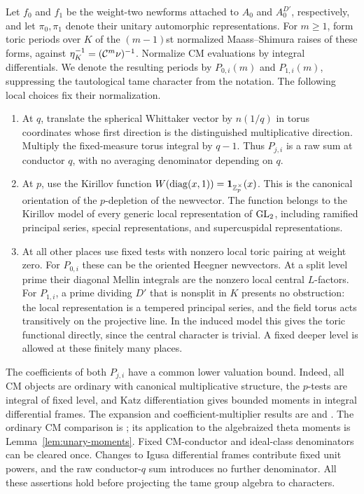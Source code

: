 Let $f_0$ and $f_1$ be the weight-two newforms attached to $A_0$ and
$A_0^{D'}$, respectively, and let $\pi_0,\pi_1$ denote their unitary
automorphic representations.  For $m\ge1$, form toric periods over $K$ of
the $(m-1)$st normalized Maass--Shimura raises of these forms, against
$\eta_K^{-1}=(\mathcal C^m\nu)^{-1}$.  Normalize CM evaluations by integral
differentials.  We denote the resulting periods by $P_{0,i}(m)$ and
$P_{1,i}(m)$, suppressing the tautological tame character from the
notation.  The following local choices fix their normalization.

\begin{enumerate}
\item At $q$, translate the spherical Whittaker vector by $n(1/q)$ in
torus coordinates whose first direction is the distinguished
multiplicative direction.  Multiply the fixed-measure torus integral by
$q-1$.  Thus $P_{j,i}$ is a raw sum at conductor $q$, with no averaging
denominator depending on $q$.
\item At $p$, use the Kirillov function
$W(\operatorname{diag}(x,1))=\mathbf 1_{\mathbb Z_p^\times}(x)$.  This is the canonical orientation
of the $p$-depletion of the newvector.  The function belongs to the
Kirillov model of every generic local representation of $\operatorname{GL}_2$, including
ramified principal series, special representations, and supercuspidal
representations.
\item At all other places use fixed tests with nonzero local toric
pairing at weight zero.  For $P_{0,i}$ these can be the oriented Heegner
newvectors.  At a split level prime their diagonal Mellin integrals are
the nonzero local central $L$-factors.  For $P_{1,i}$, a prime dividing
$D'$ that is nonsplit in $K$ presents no obstruction: the local
representation is a tempered principal series, and the field torus acts
transitively on the projective line.  In the induced model this gives
the toric functional directly, since the central character is trivial.
A fixed deeper level is allowed at these finitely many places.
\end{enumerate}

The coefficients of both $P_{j,i}$ have a common lower valuation bound.
Indeed, all CM objects are ordinary with canonical multiplicative
structure, the $p$-tests are integral of fixed level, and Katz
differentiation gives bounded moments in integral differential frames.
The expansion and coefficient-multiplier results are
\citet[Section~5.2]{Katz1976} and
\citet[Theorem~6.10, Sections~11.1--11.7 and~15.21--15.24]{AndreattaGoren2005}.
The ordinary CM comparison is
\citet[Section~1.4, Theorem~1.2]{HidaTilouine1993}; its application
to the algebraized theta moments is Lemma~\ref{lem:unary-moments}.
Fixed CM-conductor and ideal-class denominators can be cleared once.
Changes to Igusa differential frames contribute fixed unit powers, and
the raw conductor-$q$ sum introduces no further denominator.  All these
assertions hold before projecting the tame group algebra to characters.

